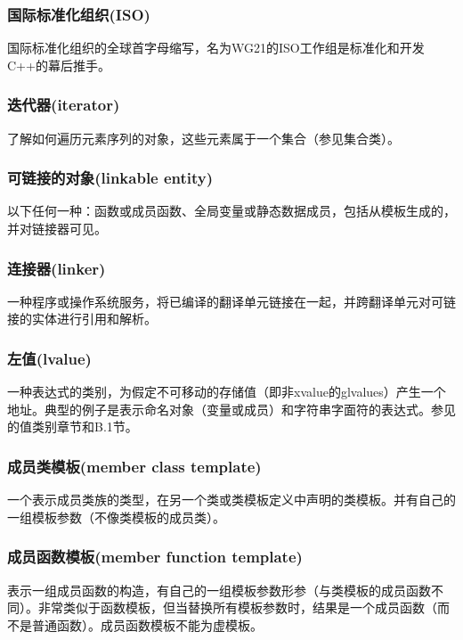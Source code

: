 \subsubsection{国际标准化组织(ISO)}

国际标准化组织的全球首字母缩写，名为WG21的ISO工作组是标准化和开发C++的幕后推手。

\subsubsection{迭代器(iterator)}

了解如何遍历元素序列的对象，这些元素属于一个集合（参见集合类）。

\subsubsection{可链接的对象(linkable entity)}

以下任何一种：函数或成员函数、全局变量或静态数据成员，包括从模板生成的，并对链接器可见。

\subsubsection{连接器(linker)}

一种程序或操作系统服务，将已编译的翻译单元链接在一起，并跨翻译单元对可链接的实体进行引用和解析。

\subsubsection{左值(lvalue)}

一种表达式的类别，为假定不可移动的存储值（即非xvalue的glvalues）产生一个地址。典型的例子是表示命名对象（变量或成员）和字符串字面符的表达式。参见的值类别章节和B.1节。

\subsubsection{成员类模板(member class template)}

一个表示成员类族的类型，在另一个类或类模板定义中声明的类模板。并有自己的一组模板参数（不像类模板的成员类）。

\subsubsection{成员函数模板(member function template)}

表示一组成员函数的构造，有自己的一组模板参数形参（与类模板的成员函数不同）。非常类似于函数模板，但当替换所有模板参数时，结果是一个成员函数（而不是普通函数）。成员函数模板不能为虚模板。

